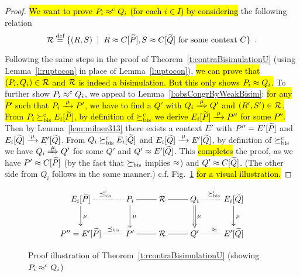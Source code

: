 \begin{proof}
\hl{We want to prove $P_i \mathrel{\approx^{\rm{c}}} Q_i$ (for each $i \in I$) by considering}
the following relation
\begin{equation*}
{\cal R} \stackrel{\mbox{\scriptsize def}}{=} \{(R,S) \; \mid \; R \approx C [\widetilde P], S \approx C [\widetilde Q] \mbox{~for some context
$C$} \} \enspace.
\end{equation*}

Following the same steps in the proof of
Theorem~\ref{t:contraBisimulationU}
(using Lemma~\ref{l:ruptocon}
in place of Lemma~\ref{l:uptocon}), \hl{we can prove that $(P_i, Q_i)
\in{\cal R}$ and ${\cal R}$ is indeed a bisimulation. But this only shows $P_i \approx Q_i$.}
%
To further show $P_i \mathrel{\approx^{\rm{c}}} Q_i$, we appeal to
Lemma~\ref{l:obsCongrByWeakBisim}: \hl{for any $P'$ such that $P_i \arr{\mu} P'$, we have to
  find a $Q'$ with $Q_i \Arr{\mu} Q'$ and $(R',S') \in {\cal R}$.
%
From $P_i \mathrel{\succeq^{\rm{c}}_{\rm{bis}}} E_i[{\widetilde P}]$, by definition of $\mathrel{\succeq^{\rm{c}}_{\rm{bis}}}$ we derive $E_i[{\til P}] \arr{\mu}
P''$ for some $P''$.} Then by Lemma~\ref{lem:milner313} there exists a context
$E'$ with $P'' = E'[{\widetilde P}]$ and $E_i[{\til Q}] \arr{\mu} E'[{\til Q}]$.
%
From $Q_i \mathrel{\succeq^{\rm{c}}_{\rm{bis}}} E_i[{\widetilde Q}]$ and $E_i[{\til Q}] \arr{\mu} E'[{\til
  Q}]$, by definition of $\mathrel{\succeq^{\rm{c}}_{\rm{bis}}}$ we have $Q_i \Arr{\mu} Q'$ for some
$Q'$ and $Q' \approx E'[{\widetilde Q}]$. This \hl{completes} the proof, as we have
$P' \approx C[{\widetilde P}]$ (by the fact that $\mathrel{\succeq_{\rm{bis}}}$ implies $\approx$) and
$Q' \approx C[{\widetilde Q}]$. (The other side from $Q_i$ follows in the same manner.)
c.f. Fig.~\ref{fig:314} \hl{for a visual illustration.}
\end{proof}

\begin{figure}[ht]
\begin{displaymath}
  \xymatrix{
    {E_i[{\til P}]} \ar@{.}[r]^{\preceq^{\mathrm{c}}_{\mathrm{bis}}} \ar@{->}[d]^{\mu} & {P_i} \ar@{-}[r]
    \ar@{->}[d]^{\mu} & {\R} \ar@{-}[r] & {Q_i} \ar@{.}[r]^{\rcontr}
    \ar@{=>}[d]^{\mu} & {E_i[{\til Q}]} \ar@{->}[d]^{\mu} \\
    {P'' = E'[{\til P}]} \ar@{.}[r]^{\qquad\preceq_{\mathrm{bis}}} & {P'} \ar@{-}[r] & {\R} \ar@{-}[r] & {Q'} \ar@{.}[r]^{\wb} 
    & {E'[{\til Q}]} \\
  }
\end{displaymath}
\caption{Proof illustration of Theorem~\ref{t:rcontraBisimulationU}
  (showing $P_i \mathrel{\approx^{\rm{c}}} Q_i$)}
\label{fig:314}
\end{figure}
